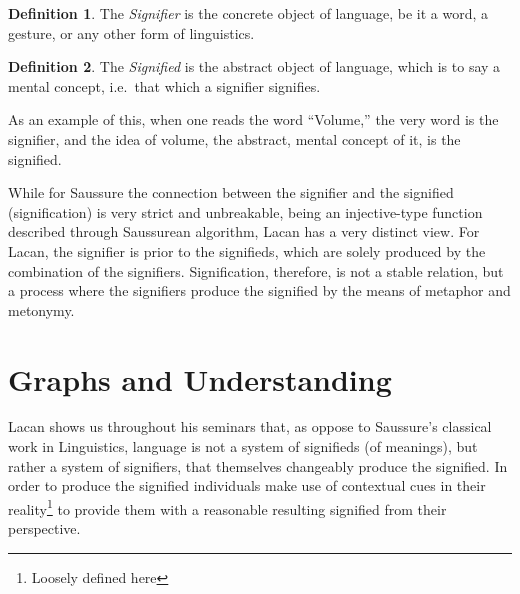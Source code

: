 \documentclass[11pt,letterpaper]{article}
\theoremstyle{definition}
\newtheorem{defn}{Definition}[section]
\begin{document}
\begin{defn}\label{def:signifier}
    The \emph{Signifier} is the concrete object of language, be it a word, a gesture, or any other form of linguistics.\autocite{berger_2013}
\end{defn}
\begin{defn}\label{def:signified}
    The \emph{Signified} is the abstract object of language, which is to say a mental concept, i.e.\ that which a signifier signifies.\autocite{berger_2013}
\end{defn}
As an example of this, when one reads the word ``Volume,'' the very word is the signifier, and the idea of volume, the abstract, mental concept of it, is the signified.

While for Saussure the connection between the signifier and the signified (signification) is very strict and unbreakable, being an injective-type function described through Saussurean algorithm, Lacan has a very distinct view. For Lacan, the signifier is prior to the signifieds, which are solely produced by the combination of the signifiers. Signification, therefore, is not a stable relation, but a process where the signifiers produce the signified by the means of metaphor and metonymy.\autocite{lacan_miller_2000}

\newpage
\section{Graphs and Understanding}

Lacan shows us throughout his seminars that, as oppose to Saussure's classical work in Linguistics, language is not a system of signifieds (of meanings), but rather a system of signifiers, that themselves changeably produce the signified. In order to produce the signified individuals make use of contextual cues in their reality\footnote{Loosely defined here} to provide them with a reasonable resulting signified from their perspective.
\end{document}
